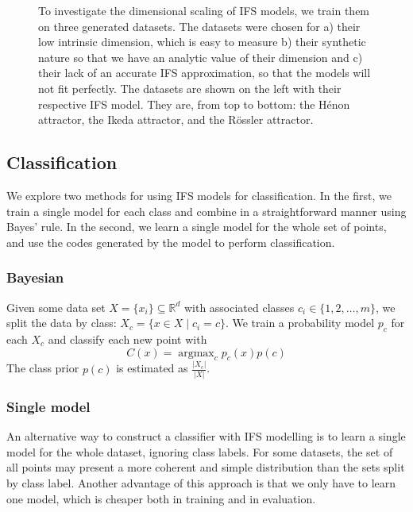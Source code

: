 \documentclass[10pt,a4paper,oneside]{article}
\theoremstyle{definition}
\DeclareMathOperator*{\argmax}{argmax}
\begin{document}
\begin{figure}[t]
\begin{subfigure}{0.33\textwidth}
\begin{tabular}{c c }
	\end{tabular}
  \end{subfigure}
  \caption{To investigate the dimensional scaling of IFS models, we train them on three generated datasets. The datasets were chosen for a) their low intrinsic dimension, which is easy to measure b) their synthetic nature so that we have an analytic value of their dimension and c) their lack of an accurate IFS approximation, so that the models will not fit perfectly. The datasets are shown on the left with their respective IFS model. They are, from top to bottom: the H\'enon attractor, the Ikeda attractor, and the R\"ossler attractor.}
  \label{fig:dim_scale}
\end{figure}


\subsection*{Classification}

We explore two methods for using IFS models for classification. In the first, we train a single model for each class and combine in a straightforward manner using Bayes' rule. In the second, we learn a single model for the whole set of points, and use the codes generated by the model to perform classification.  

\subsubsection*{Bayesian}

Given some data set $X = \{x_i\} \subseteq {\mathbb R}^d$ with associated classes $c_i \in \{1, 2, \ldots, m\}$, we split the data by class: $X_c = \{ x \in X \mid c_i = c\}$. We train a probability model $p_c$ for each $X_c$ and classify each new point with
\[
C(x) = \argmax_{c} p_c(x) p(c)
\]
The class prior $p(c)$ is estimated as $\frac{|X_c|}{|X|}$.

\subsubsection*{Single model}

An alternative way to construct a classifier with IFS modelling is to learn a single model for the whole dataset, ignoring class labels. For some datasets, the set of all points may present a more coherent and simple distribution than the sets split by class label. Another advantage of this approach is that we only have to learn one model, which is cheaper both in training and in evaluation.
\end{document}
